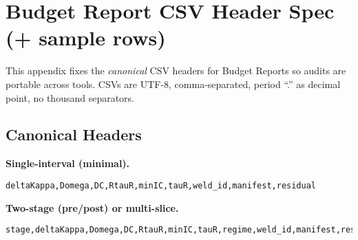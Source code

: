 \chapter{Budget Report CSV Header Spec (+ sample rows)}
\label{apx:budgetcsv}

This appendix fixes the \emph{canonical} CSV headers for Budget Reports so audits are portable across tools. CSVs are UTF-8, comma-separated, period “.” as decimal point, no thousand separators.

\section{Canonical Headers}
\label{sec:csv-headers}


\noindent\textbf{Single-interval (minimal).}
\begin{lstlisting}[style=umcpstyle, numbers=none, frame=single, basicstyle=\ttfamily\small, columns=fullflexible]
deltaKappa,Domega,DC,RtauR,minIC,tauR,weld_id,manifest,residual
\end{lstlisting}

\medskip
\noindent\textbf{Two-stage (pre/post) or multi-slice.}
\begin{lstlisting}[style=umcpstyle, numbers=none, frame=single, basicstyle=\ttfamily\small, columns=fullflexible]
stage,deltaKappa,Domega,DC,RtauR,minIC,tauR,regime,weld_id,manifest,residual
\end{lstlisting}
\newpage
